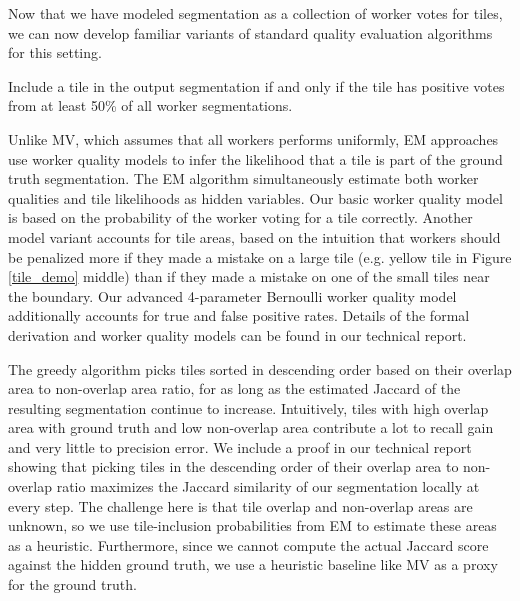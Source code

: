 \par Now that we have modeled segmentation as a collection of worker votes for tiles, we can now develop familiar variants of standard quality evaluation algorithms for this setting.

\par \noindent Include a tile in the output segmentation if and only if the tile has positive votes from at least 50\% of all worker segmentations.

\par \noindent Unlike MV, which assumes that all workers performs uniformly, EM approaches use worker quality models to infer the likelihood that a tile is part of the ground truth segmentation. The EM algorithm simultaneously estimate both worker qualities and tile likelihoods as hidden variables. Our basic worker quality model is based on the probability of the worker voting for a tile correctly. Another model variant accounts for tile areas, based on the intuition that workers should be penalized more if they made a mistake on a large tile (e.g. yellow tile in Figure \ref{tile_demo} middle) than if they made a mistake on one of the small tiles near the boundary. Our advanced 4-parameter Bernoulli worker quality model additionally accounts for true and false positive rates. Details of the formal derivation and worker quality models can be found in our technical report.

\par \noindent The greedy algorithm picks tiles sorted in descending order based on their overlap area to non-overlap area ratio, for as long as the estimated Jaccard of the resulting segmentation continue to increase. Intuitively, tiles with high overlap area with ground truth and low non-overlap area contribute a lot to recall gain and very little to precision error. We include a proof in our technical report showing that picking tiles in the descending order of their overlap area to non-overlap ratio maximizes the Jaccard similarity of our segmentation locally at every step. The challenge here is that tile overlap and non-overlap areas are unknown, so we use tile-inclusion probabilities from EM to estimate these areas as a heuristic. Furthermore, since we cannot compute the actual Jaccard score against the hidden ground truth, we use a heuristic baseline like MV as a proxy for the ground truth.

